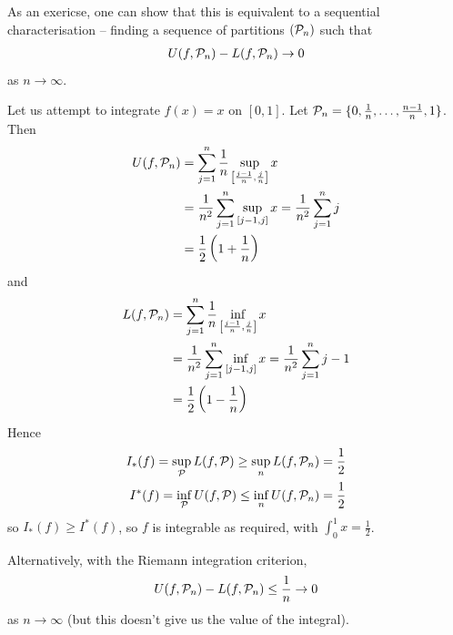 \documentclass{../../template/note}
\begin{document}
    \begin{remark*}
        As an exericse, one can show that this is equivalent to a sequential characterisation -- finding a sequence of partitions \((\mathcal{P}_n)\) such that
        \begin{align*}
            U(f, \mathcal{P}_n) - L(f, \mathcal{P}_n) \to 0
        \end{align*}
        as \(n \to \infty\).        
    \end{remark*}
    
    \begin{example*}
        Let us attempt to integrate \(f(x) = x\) on \([0, 1]\). Let \(\mathcal{P}_n = \{0, \frac 1 n, \dots, \frac {n-1} n, 1\}\). Then
        \begin{align*}
            U(f, \mathcal{P}_n) &= \sum_{j=1}^n \frac 1 n \sup_{\left[\frac{j-1}n, \frac jn\right]} x \\
            &= \frac 1 {n^2} \sum_{j=1}^n \sup_{[j-1, j]} x = \frac 1 {n^2} \sum_{j=1}^n j \\
            &= \frac 1 2 \left(1 + \frac 1 n\right)
        \end{align*}
        and 
        \begin{align*}
            L(f, \mathcal{P}_n) &= \sum_{j=1}^n \frac 1 n \inf_{\left[\frac{j-1}n, \frac jn\right]} x \\
            &= \frac 1 {n^2} \sum_{j=1}^n \inf_{[j-1, j]} x = \frac 1 {n^2} \sum_{j=1}^n j-1 \\
            &= \frac 1 2 \left(1 - \frac 1 n\right)
        \end{align*}
        Hence
        \begin{align*}
            I_*(f) = \sup_{\mathcal{P}}L(f, \mathcal{P}) \geq \sup_n L(f, \mathcal{P}_n) &= \frac 1 2 \\
            I^*(f) = \inf_{\mathcal{P}}U(f, \mathcal{P}) \leq \inf_n U(f, \mathcal{P}_n) &= \frac 1 2
        \end{align*}
        so \(I_*(f) \geq I^*(f)\), so \(f\) is integrable as required, with \(\int_0^1 x = \frac 1 2\).
        
        Alternatively, with the Riemann integration criterion,
        \begin{align*}
            U(f, \mathcal{P}_n) - L(f, \mathcal{P}_n) \leq \frac 1 n \to 0
        \end{align*}
        as \(n \to \infty\) (but this doesn't give us the value of the integral).
    \end{example*}
    
\end{document}
